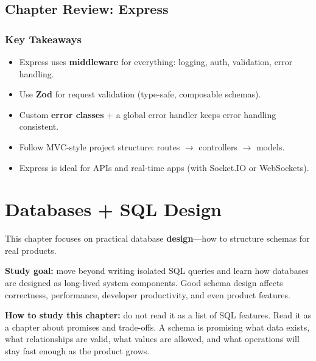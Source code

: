 \documentclass[12pt, a4paper, oneside]{book}
\begin{document}
\section{Chapter Review: Express}

\subsection{Key Takeaways}
\begin{itemize}[leftmargin=2em]
    \item Express uses \textbf{middleware} for everything: logging, auth, validation, error handling.
    \item Use \textbf{Zod} for request validation (type-safe, composable schemas).
    \item Custom \textbf{error classes} + a global error handler keeps error handling consistent.
    \item Follow MVC-style project structure: routes $\to$ controllers $\to$ models.
    \item Express is ideal for APIs and real-time apps (with Socket.IO or WebSockets).
\end{itemize}



\chapter{Databases + SQL Design}

This chapter focuses on practical database \textbf{design}---how to structure schemas for real products.

\begin{studybox}
\textbf{Study goal:} move beyond writing isolated SQL queries and learn how databases are designed as long-lived system components. Good schema design affects correctness, performance, developer productivity, and even product features.
\end{studybox}

\begin{notebox}
\textbf{How to study this chapter:} do not read it as a list of SQL features. Read it as a chapter about promises and trade-offs. A schema is promising what data exists, what relationships are valid, what values are allowed, and what operations will stay fast enough as the product grows.
\end{notebox}
\end{document}
